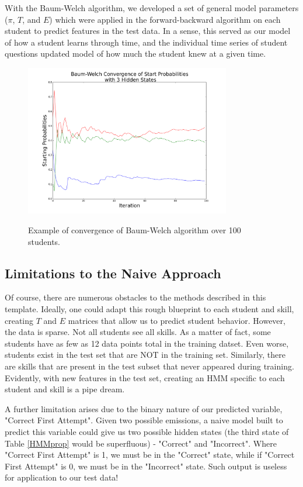 \documentclass{article} %
\begin{document}
With the Baum-Welch algorithm, we developed a set of general model parameters ($\pi$, $T$, and $E$) which were applied in the forward-backward algorithm on each student to predict features in the test data. In a sense, this served as our model of how a student learns through time, and the individual time series of student questions updated model of how much the student knew at a given time.

\begin{figure}[h]
\begin{center}
	\includegraphics[width=0.8\textwidth]{bwConv3a.png}
	\label{fig:sgdbw}
\end{center}
\caption{Example of convergence of Baum-Welch algorithm over 100 students.}
\end{figure}

\subsection{Limitations to the Naive Approach}

Of course, there are numerous obstacles to the methods described in this template. Ideally, one could adapt this rough blueprint to each student and skill, creating $T$ and $E$ matrices that allow us to predict student behavior. However, the data is sparse. Not all students see all skills. As a matter of fact, some students have as few as 12 data points total in the training datset. Even worse, students exist in the test set that are NOT in the training set. Similarly, there are skills that are present in the test subset that never appeared during training. Evidently, with new features in the test set, creating an HMM specific to each student and skill is a pipe dream.

A further limitation arises due to the binary nature of our predicted variable, "Correct First Attempt". Given two possible emissions, a naive model built to predict this variable could give us two possible hidden states (the third state of Table \ref{HMMprop} would be superfluous) - "Correct" and "Incorrect". Where "Correct First Attempt" is 1, we must be in the "Correct" state, while if "Correct First Attempt" is 0, we must be in the "Incorrect" state. Such output is useless for application to our test data!
\end{document}
